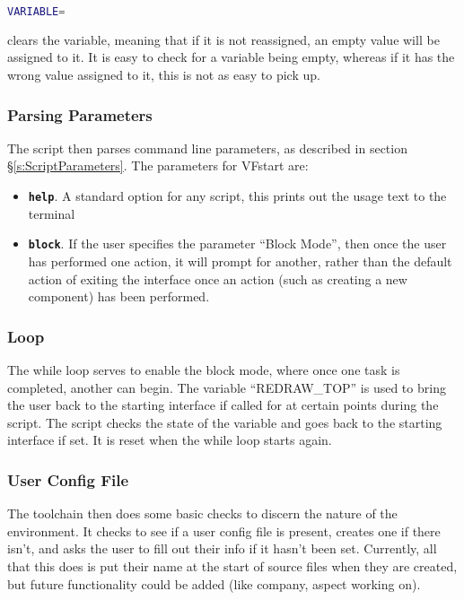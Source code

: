 \documentclass[a4paper, oneside, 11pt, titlepage, onecolumn, openright]{report}
\begin{document}
\begin{lstlisting}[frame=trBL, breaklines=true, language = bash]				
VARIABLE=			
\end{lstlisting}				

clears the variable, meaning that if it is not reassigned, an empty value will be assigned to it. It is easy to check for a variable being empty, whereas if it has the wrong value assigned to it, this is not as easy to pick up.

\subsubsection{Parsing Parameters}
			\label{sss:VFstartPassingParameters}
			The script then parses command line parameters, as described in section \S\ref{s:ScriptParameters}.
			The parameters for VFstart are:
			
\begin{itemize}

\item \texttt{\textbf{help}}. A standard option for any script, this prints out the usage text to the terminal

\item \texttt{\textbf{block}}. If the user specifies the parameter ``Block Mode'', then once the user has performed one action, it will prompt for another, rather than the default action of exiting the interface once an action (such as creating a new component) has been performed.
\end{itemize}

\subsubsection{Loop}
			\label{sss:VFstartLoop}
			The while loop serves to enable the block mode, where once one task is completed, another can begin.
			The variable ``REDRAW\_TOP'' is used to bring the user back to the starting interface if called for at certain points during the script. The script checks the state of the variable and goes back to the starting interface if set. It is reset when the while loop starts again.
			
\subsubsection{User Config File}
			\label{sss:VFstartUserConfigFile}
			
			The toolchain then does some basic checks to discern the nature of the environment. It checks to see if a user config file is present, creates one if there isn't, and asks the user to fill out their info if it hasn't been set. 
			Currently, all that this does is put their name at the start of source files when they are created, but future functionality could be added (like company, aspect working on).
			
\end{document}

